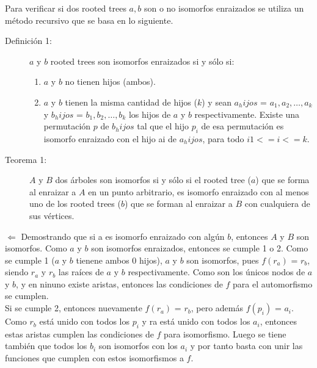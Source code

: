 \documentclass[a4paper,12pt,twocolumn]{article}
\begin{document}
	Para verificar si dos rooted trees $a, b$ son o no isomorfos enraizados se utiliza un método recursivo que se basa en lo siguiente. \\
	
	\begin{description}
		\item[Definición 1:] $a$ y $b$ rooted trees son isomorfos enraizados si y sólo si:\\
		\begin{enumerate}
			\item $a$ y $b$ no tienen hijos (ambos).
			\item $a$ y $b$ tienen la misma cantidad de hijos ($k$) y sean $a_hijos$ = $a_1, a_2, … , a_k$ y $b_hijos$ = $b_1, b_2, … , b_k$ los hijos de $a$ y $b$ respectivamente. Existe una permutación $p$ de $b_hijos$ tal que el hijo $p_i$ de esa permutación es isomorfo enraizado con el hijo ai de $a_hijos$, para todo $i 1 <= i <= k$.
		\end{enumerate}
	\end{description}
	
	\begin{description}
		\item[Teorema 1:] $A$ y $B$ dos árboles son isomorfos si y sólo si el rooted tree ($a$) que se forma al enraizar a $A$ en un punto arbitrario, es isomorfo enraizado con al menos uno de los rooted trees ($b$) que se forman al enraizar a $B$ con cualquiera de sus vértices.\\
	\end{description}
	 	
	$\Leftarrow$ Demostrando que si a es isomorfo enraizado con algún $b$, entonces $A$ y $B$ son isomorfos. Como $a$ y $b$ son isomorfos enraizados, entonces se cumple 1 o 2. 
	Como se cumple 1 ($a$ y $b$ tienene ambos 0 hijos), $a$ y $b$ son isomorfos, pues $f(r_a)$ = $r_b$, siendo $r_a$ y $r_b$ las raíces de $a$ y $b$ respectivamente. Como son los únicos nodos de $a$ y $b$, y en ninuno existe aristas, entonces las condiciones de $f$ para el automorfismo se cumplen.\\
	
	Si se cumple 2, entonces nuevamente $f(r_a)$ = $r_b$, pero además $f(p_i)$ = $a_i$. Como $r_b$ está unido con todos los $p_i$ y ra está unido con todos los $a_i$, entonces estas aristas cumplen las condiciones de $f$ para isomorfismo. Luego se tiene también que todos los $b_i$ son isomorfos con los $a_i$ y por tanto basta con unir las funciones que cumplen con estos isomorfismos a $f$.\\
	
\end{document}
